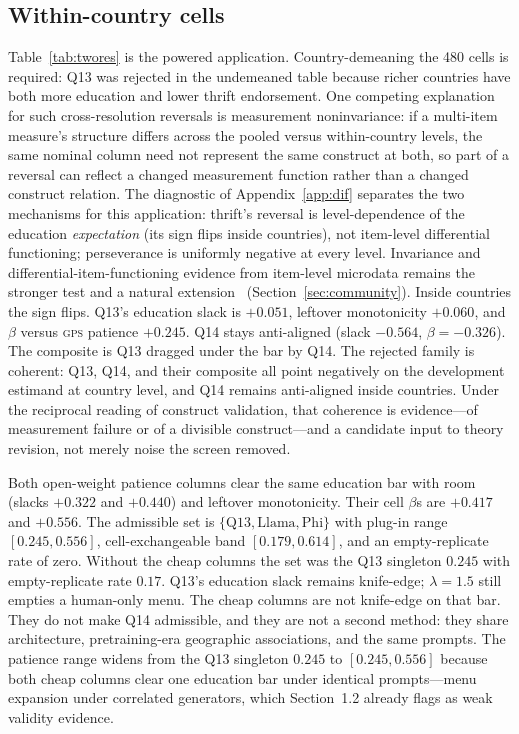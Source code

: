\documentclass[10pt,letterpaper]{article}
\newcommand{\GPS}{\textsc{gps}}
\begin{document}
\subsection{Within-country cells}
\label{sec:app-cells}

Table~\ref{tab:twores} is the powered application.
Country-demeaning the 480 cells is required: Q13 was rejected in the undemeaned table because richer countries have both more education and lower thrift endorsement.
One competing explanation for such cross-resolution reversals is measurement noninvariance: if a multi-item measure's structure differs across the pooled versus within-country levels, the same nominal column need not represent the same construct at both, so part of a reversal can reflect a changed measurement function rather than a changed construct relation.
The diagnostic of Appendix~\ref{app:dif} separates the two mechanisms for this application: thrift's reversal is level-dependence of the education \emph{expectation} (its sign flips inside countries), not item-level differential functioning; perseverance is uniformly negative at every level.
Invariance and differential-item-functioning evidence from item-level microdata remains the stronger test and a natural extension~\cite{zeinfeld2026} (Section~\ref{sec:community}).
Inside countries the sign flips.
Q13's education slack is $+0.051$, leftover monotonicity $+0.060$, and $\beta$ versus \GPS{} patience $+0.245$.
Q14 stays anti-aligned (slack $-0.564$, $\beta=-0.326$).
The composite is Q13 dragged under the bar by Q14.
The rejected family is coherent: Q13, Q14, and their composite all point negatively on the development estimand at country level, and Q14 remains anti-aligned inside countries.
Under the reciprocal reading of construct validation, that coherence is evidence---of measurement failure or of a divisible construct---and a candidate input to theory revision, not merely noise the screen removed.

Both open-weight patience columns clear the same education bar with room (slacks $+0.322$ and $+0.440$) and leftover monotonicity.
Their cell $\beta$s are $+0.417$ and $+0.556$.
The admissible set is $\{\mathrm{Q13},\mathrm{Llama},\mathrm{Phi}\}$ with plug-in range $[0.245,0.556]$, cell-exchangeable band $[0.179,0.614]$, and an empty-replicate rate of zero.
Without the cheap columns the set was the Q13 singleton $0.245$ with empty-replicate rate $0.17$.
Q13's education slack remains knife-edge; $\lambda=1.5$ still empties a human-only menu.
The cheap columns are not knife-edge on that bar.
They do not make Q14 admissible, and they are not a second method: they share architecture, pretraining-era geographic associations, and the same prompts.
The patience range widens from the Q13 singleton $0.245$ to $[0.245,0.556]$ because both cheap columns clear one education bar under identical prompts---menu expansion under correlated generators, which Section~1.2 already flags as weak validity evidence.
\end{document}
